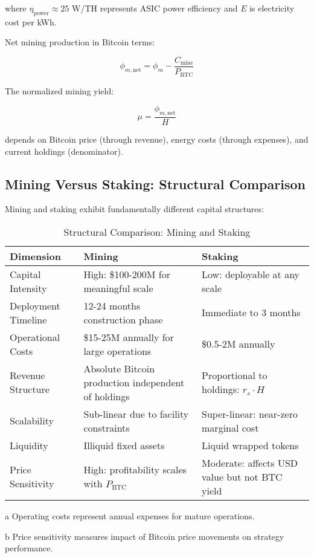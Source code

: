 \documentclass[
  journal=medium,
  manuscript=article-type,
  year=2025,
  volume=1,
]{cup-journal}
\theoremstyle{definition}
\begin{document}
where $\eta_{\text{power}} \approx 25$ W/TH represents ASIC power efficiency and $E$ is electricity cost per kWh.

Net mining production in Bitcoin terms:

\begin{equation}
\phi_{m,\text{net}} = \phi_m - \frac{C_{\text{mine}}}{P_{\text{BTC}}}
\end{equation}

The normalized mining yield:

\begin{equation}
\mu = \frac{\phi_{m,\text{net}}}{H}
\end{equation}

depends on Bitcoin price (through revenue), energy costs (through expenses), and current holdings (denominator).

\subsection{Mining Versus Staking: Structural Comparison}

Mining and staking exhibit fundamentally different capital structures:

\begin{table}[hbt!]
\begin{threeparttable}
\caption{Structural Comparison: Mining and Staking}
\label{tab:structure}
\begin{tabular}{@{}p{3cm}p{5.5cm}p{5.5cm}@{}}
\toprule
\headrow Dimension & Mining & Staking \\
\midrule
Capital Intensity & High: \$100-200M for meaningful scale & Low: deployable at any scale \\
\addlinespace
Deployment Timeline & 12-24 months construction phase & Immediate to 3 months \\
\addlinespace
Operational Costs\tnote{a} & \$15-25M annually for large operations & \$0.5-2M annually \\
\addlinespace
Revenue Structure & Absolute Bitcoin production independent of holdings & Proportional to holdings: $r_s \cdot H$ \\
\addlinespace
Scalability & Sub-linear due to facility constraints & Super-linear: near-zero marginal cost \\
\addlinespace
Liquidity & Illiquid fixed assets & Liquid wrapped tokens \\
\addlinespace
Price Sensitivity\tnote{b} & High: profitability scales with $P_{\text{BTC}}$ & Moderate: affects USD value but not BTC yield \\
\bottomrule
\end{tabular}
\begin{tablenotes}[hang]
\item[a]Operating costs represent annual expenses for mature operations.
\item[b]Price sensitivity measures impact of Bitcoin price movements on strategy performance.
\end{tablenotes}
\end{threeparttable}
\end{table}
\end{document}
